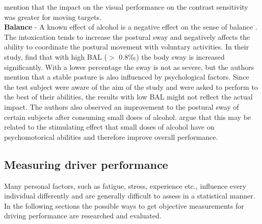 \textcite[]{nicholson1995effects} mention that the impact on the visual performance on the contrast sensitivity was greater for moving targets. 
\\
\textbf{Balance} - A known effect of alcohol is a negative effect on the sense of balance \autocite{nieschalk1999effects}.
The intoxication tends to increase the postural sway and negatively affects the ability to coordinate the postural movement with voluntary activities. 
In their study, \textcite{nieschalk1999effects} find that with high BAL ($>$ 0.8‰) the body sway is increased significantly. 
With a lower percentage the sway is not as severe, but the authors mention that a stable posture is also influenced by psychological factors.
Since the test subject were aware of the aim of the study and were asked to perform to the best of their abilities, the results with low BAL might not reflect the actual impact. 
The authors also observed an improvement to the postural sway of certain subjects after consuming small doses of alcohol. 
\textcite{nieschalk1999effects} argue that this may be related to the stimulating effect that small doses of alcohol have on psychomotorical abilities and therefore improve overall performance.



%
\subsection{Measuring driver performance}
\label{section:measurePerformance}
%
Many personal factors, such as fatigue, stress, experience etc., influence every individual differently and are generally difficult to assess in a statistical manner. \autocite[16]{jurecki2011test}
In the following sections the possible ways to get objective measurements for driving performance are researched and evaluated.
\\

